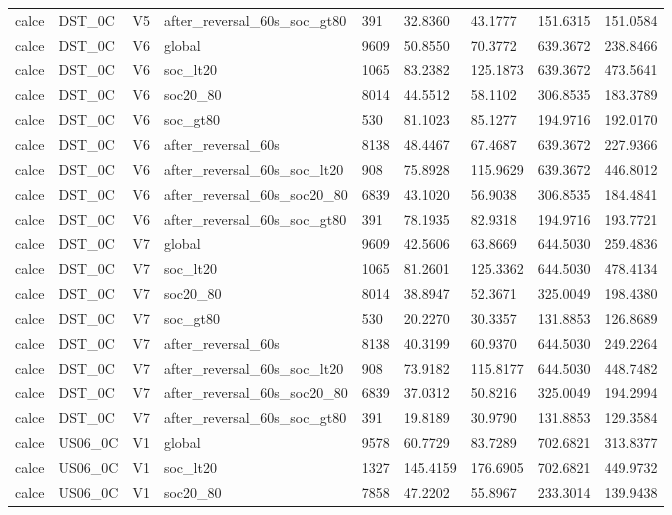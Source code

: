 \begin{tabular}{lllllllll}
calce & DST\_0C & V5 & after\_reversal\_60s\_soc\_gt80 & 391 & 32.8360 & 43.1777 & 151.6315 & 151.0584 \\
calce & DST\_0C & V6 & global & 9609 & 50.8550 & 70.3772 & 639.3672 & 238.8466 \\
calce & DST\_0C & V6 & soc\_lt20 & 1065 & 83.2382 & 125.1873 & 639.3672 & 473.5641 \\
calce & DST\_0C & V6 & soc20\_80 & 8014 & 44.5512 & 58.1102 & 306.8535 & 183.3789 \\
calce & DST\_0C & V6 & soc\_gt80 & 530 & 81.1023 & 85.1277 & 194.9716 & 192.0170 \\
calce & DST\_0C & V6 & after\_reversal\_60s & 8138 & 48.4467 & 67.4687 & 639.3672 & 227.9366 \\
calce & DST\_0C & V6 & after\_reversal\_60s\_soc\_lt20 & 908 & 75.8928 & 115.9629 & 639.3672 & 446.8012 \\
calce & DST\_0C & V6 & after\_reversal\_60s\_soc20\_80 & 6839 & 43.1020 & 56.9038 & 306.8535 & 184.4841 \\
calce & DST\_0C & V6 & after\_reversal\_60s\_soc\_gt80 & 391 & 78.1935 & 82.9318 & 194.9716 & 193.7721 \\
calce & DST\_0C & V7 & global & 9609 & 42.5606 & 63.8669 & 644.5030 & 259.4836 \\
calce & DST\_0C & V7 & soc\_lt20 & 1065 & 81.2601 & 125.3362 & 644.5030 & 478.4134 \\
calce & DST\_0C & V7 & soc20\_80 & 8014 & 38.8947 & 52.3671 & 325.0049 & 198.4380 \\
calce & DST\_0C & V7 & soc\_gt80 & 530 & 20.2270 & 30.3357 & 131.8853 & 126.8689 \\
calce & DST\_0C & V7 & after\_reversal\_60s & 8138 & 40.3199 & 60.9370 & 644.5030 & 249.2264 \\
calce & DST\_0C & V7 & after\_reversal\_60s\_soc\_lt20 & 908 & 73.9182 & 115.8177 & 644.5030 & 448.7482 \\
calce & DST\_0C & V7 & after\_reversal\_60s\_soc20\_80 & 6839 & 37.0312 & 50.8216 & 325.0049 & 194.2994 \\
calce & DST\_0C & V7 & after\_reversal\_60s\_soc\_gt80 & 391 & 19.8189 & 30.9790 & 131.8853 & 129.3584 \\
calce & US06\_0C & V1 & global & 9578 & 60.7729 & 83.7289 & 702.6821 & 313.8377 \\
calce & US06\_0C & V1 & soc\_lt20 & 1327 & 145.4159 & 176.6905 & 702.6821 & 449.9732 \\
calce & US06\_0C & V1 & soc20\_80 & 7858 & 47.2202 & 55.8967 & 233.3014 & 139.9438 \\

\end{tabular}
